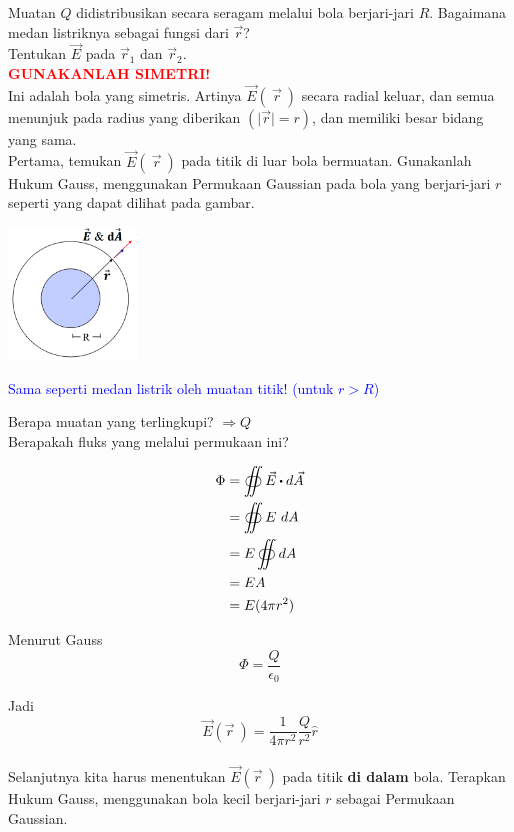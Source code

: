 \documentclass[twocolumn, 11pt]{article}%
\newcommand\sbullet[1][.5]{\mathbin{\ThisStyle{\vcenter{\hbox{%
  \scalebox{#1}{$\SavedStyle\bullet$}}}}}%
}
\begin{document}
    Muatan $Q$ didistribusikan secara seragam melalui bola berjari-jari $R$. Bagaimana medan listriknya sebagai fungsi dari $\vec r$?\\
    Tentukan $\vec E$ pada $\vec r_1$ dan $\vec r_2$.\\

    \textcolor{red}{\textbf{GUNAKANLAH SIMETRI!}}\\

    Ini adalah bola yang simetris. Artinya $\vec E (\ \vec r\ )$ secara radial keluar, dan semua menunjuk pada radius yang diberikan $(\mid \vec r\mid=r)$, dan memiliki besar bidang yang sama.\\

    Pertama, temukan $\vec E (\ \vec r\ )$ pada titik di luar bola bermuatan. Gunakanlah Hukum Gauss, menggunakan Permukaan Gaussian pada bola yang berjari-jari $r$ seperti yang dapat dilihat pada gambar.

    \begin{center}
        \includegraphics[width=130px]{27.png}
    \end{center}

    \textcolor{blue}{Sama seperti medan listrik oleh muatan titik! (untuk $r>R$)}

    Berapa muatan yang terlingkupi? $\Rightarrow Q$\\
    Berapakah fluks yang melalui permukaan ini?

    \begin{align*}
        \Phi &= \oiint \vec E \sbullet d\vec A\\
             &= \oiint E\ dA\\
             &= E \oiint dA\\
             &= EA\\
             &= E(4\pi r^2)
    \end{align*}

    Menurut Gauss
    \[ \Phi = \frac{Q}{\epsilon_0} \]

    Jadi
    \[ \vec E (\vec r\ ) = \frac1{4\pi r^2} \frac{Q}{r^2} \hat r \]\\

    Selanjutnya kita harus menentukan $\vec E (\vec r\ )$ pada titik \textbf{di dalam} bola. Terapkan Hukum Gauss, menggunakan bola kecil berjari-jari $r$ sebagai Permukaan Gaussian.\\
\end{document}

